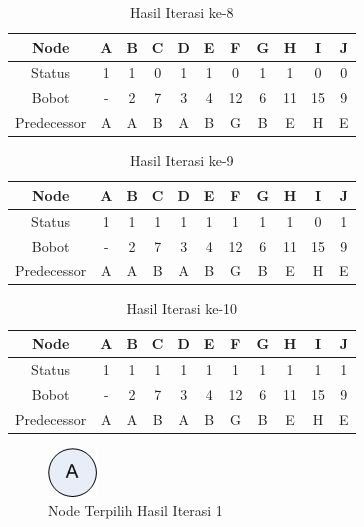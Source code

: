 \begin{enumerate}
\begin{table}[htbp]
\begin{center}
\begin{tabular}{|c|c|c|c|c|c|c|c|c|c|c|}
\hline
Node & A & B & C & D & E & F & G & H & I & J \\
\hline
Status & 1 & 1 & 0 & 1 & 1 & 0 & 1 & 1 & 0 & 0\\
\hline
Bobot & - & 2 & 7 & 3 & 4 & 12 & 6 & 11 & 15 & 9 \\
\hline
Predecessor & A & A & B & A & B & G & B & E & H  & E \\
\hline
\end{tabular}
\caption{Hasil Iterasi ke-8}
\end{center}
\end{table}

\begin{table}[htbp]
\begin{center}
\begin{tabular}{|c|c|c|c|c|c|c|c|c|c|c|}
\hline
Node & A & B & C & D & E & F & G & H & I & J \\
\hline
Status & 1 & 1 & 1 & 1 & 1 & 1 & 1 & 1 & 0 & 1\\
\hline
Bobot & - & 2 & 7 & 3 & 4 & 12 & 6 & 11 & 15 & 9 \\
\hline
Predecessor & A & A & B & A & B & G & B & E & H  & E \\
\hline
\end{tabular}
\caption{Hasil Iterasi ke-9}
\end{center}
\end{table}

\begin{table}[htbp]
\begin{center}
\begin{tabular}{|c|c|c|c|c|c|c|c|c|c|c|}
\hline
Node & A & B & C & D & E & F & G & H & I & J \\
\hline
Status & 1 & 1 & 1 & 1 & 1 & 1 & 1 & 1 & 1 & 1\\
\hline
Bobot & - & 2 & 7 & 3 & 4 & 12 & 6 & 11 & 15 & 9 \\
\hline
Predecessor & A & A & B & A & B & G & B & E & H  & E \\
\hline
\end{tabular}
\caption{Hasil Iterasi ke-10}
\end{center}
\end{table}

\newpage
\begin{figure}[htbp]
\begin{center}
	\includegraphics[scale=0.5]{fig/sunario-3/A.jpg}%
	\caption{Node Terpilih Hasil Iterasi 1}%
	\label{fig:Node A}%
\end{center}
\end{figure}



\end{enumerate}
